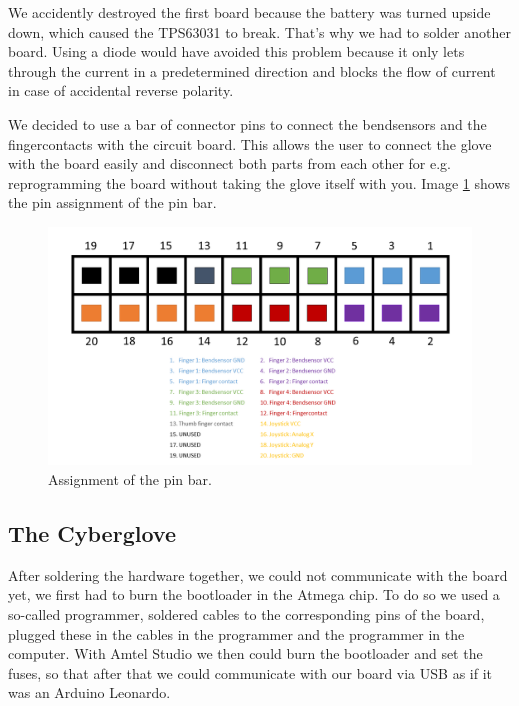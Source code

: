 We accidently destroyed the first board because the battery was turned upside down, which caused the TPS63031 to break. That’s why we had to solder another board. Using a diode would have avoided this problem because it only lets through the current in a predetermined direction and blocks the flow of current in case of accidental reverse polarity. 

We decided to use a bar of connector pins to connect the bendsensors and the fingercontacts with the circuit board. This allows the user to connect the glove with the board easily and disconnect both parts from each other for e.g. reprogramming the board without taking the glove itself with you. Image \ref{img:pins} shows the pin assignment of the pin bar.

\begin{figure}[!h]
	\centering
	\includegraphics[width=\textwidth]{./images/image7.png}
	\caption{Assignment of the pin bar.}
	\label{img:pins}
\end{figure}


\subsection{The Cyberglove}

After soldering the hardware together, we could not communicate with the board yet, we first had to burn the bootloader in the Atmega chip. To do so we used a so-called programmer, soldered cables to the corresponding pins of the board, plugged these in the cables in the programmer and the programmer in the computer. With Amtel Studio we then could burn the bootloader and set the fuses, so that after that we could communicate with our board via USB as if it was an Arduino Leonardo.

